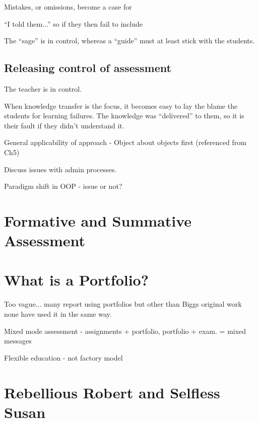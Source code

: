 Mistakes, or omissions, become a case for  


 ``I told them...'' so if they then fail to include 

 The ``sage'' is in control, whereas a ``guide'' must at least stick with the students.


\subsection{Releasing control of assessment} %
\label{sub:releasing_control_of_assessment}

The teacher is in control.


When knowledge transfer is the focus, it becomes easy to lay the blame the students for learning failures. The knowledge was ``delivered'' to them, so it is their fault if they didn't understand it.  






General applicability of approach - Object about objects first (referenced from Ch5)

Discuss issues with admin processes.

Paradigm shift in OOP
- issue or not?

\section{Formative and Summative Assessment} %
\label{sec:formative_and_summative_assessment}


\section{What is a Portfolio?} %
\label{sec:what_is_a_portfolio_}

Too vague... many report using portfolios but other than Biggs original work none have used it in the same way.


Mixed mode assessment - assignments + portfolio, portfolio + exam.
= mixed messages

Flexible education
- not factory model



\section{Rebellious Robert and Selfless Susan} %
\label{sec:rebellious_robert_and_selfless_susan}

